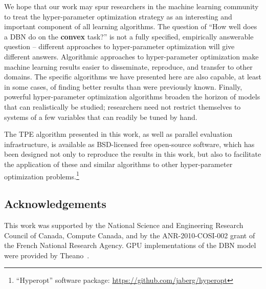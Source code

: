 \documentclass{article}
\begin{document}
We hope that our work may spur researchers in the machine learning community
to treat the
hyper-parameter optimization strategy as an interesting and important
component of all learning algorithms.
The question of ``How well does a DBN do on the {\bf convex} task?'' is not a
fully specified,
empirically answerable question --
different approaches to hyper-parameter optimization will give different answers.
Algorithmic approaches to hyper-parameter optimization make machine learning results easier to disseminate, reproduce, and transfer to other domains.
The specific algorithms we have presented here are also capable, at least in
some cases, of finding better results than were previously known.
Finally, powerful hyper-parameter optimization algorithms broaden the horizon
of models that can realistically be studied; researchers need not restrict themselves to systems of a few variables that can readily be tuned by hand.

The TPE algorithm presented in this work, as well as parallel evaluation
infrastructure, is available as BSD-licensed free
open-source software, which has been designed not only to reproduce the
results in this work, but also to facilitate the application of these and
similar algorithms to other hyper-parameter optimization problems.\footnote{
``Hyperopt'' software package: \url{https://github.com/jaberg/hyperopt}}

\subsection*{Acknowledgements}
This work was supported by the National Science and Engineering Research
Council of Canada, Compute Canada, and by the ANR-2010-COSI-002 grant of the French National Research Agency.
GPU implementations of the DBN model were provided by
Theano~\cite{bergstra+etal:2010}.


\newpage
\small


\end{document}
